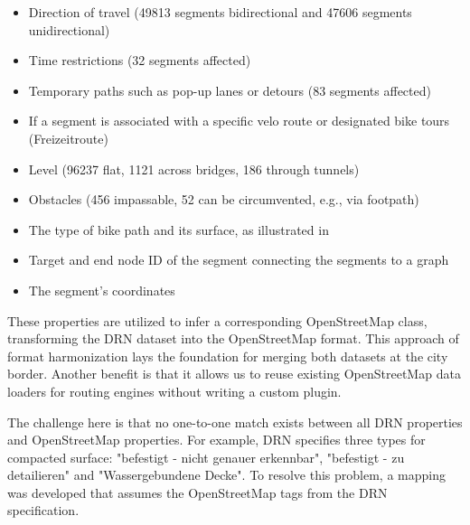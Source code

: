 \begin{itemize}
    \item Direction of travel (49813 segments bidirectional and 47606 segments unidirectional)
    \item Time restrictions (32 segments affected)
    \item Temporary paths such as pop-up lanes or detours (83 segments affected)
    \item If a segment is associated with a specific velo route or designated bike tours (Freizeitroute)
    \item Level (96237 flat, 1121 across bridges, 186 through tunnels)
    \item Obstacles (456 impassable, 52 can be circumvented, e.g., via footpath)
    \item The type of bike path and its surface, as illustrated in 
    \item Target and end node ID of the segment connecting the segments to a graph
    \item The segment's coordinates
\end{itemize}

These properties are utilized to infer a corresponding OpenStreetMap class, transforming the DRN dataset into the OpenStreetMap format. This approach of format harmonization lays the foundation for merging both datasets at the city border. Another benefit is that it allows us to reuse existing OpenStreetMap data loaders for routing engines without writing a custom plugin.

The challenge here is that no one-to-one match exists between all DRN properties and OpenStreetMap properties. For example, DRN specifies three types for compacted surface: "befestigt - nicht genauer erkennbar", "befestigt - zu detailieren" and "Wassergebundene Decke". To resolve this problem, a mapping was developed that assumes the OpenStreetMap tags from the DRN specification. 

